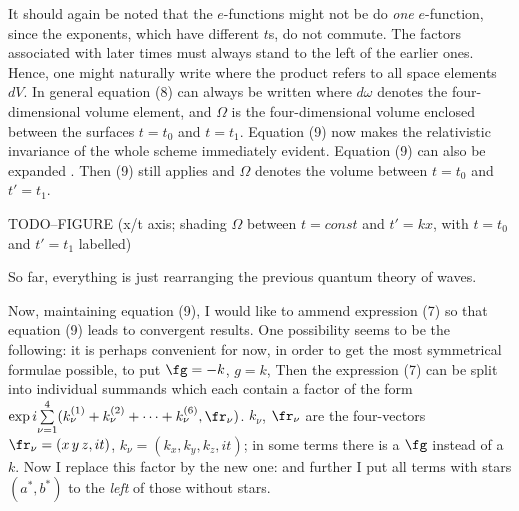 It should again be noted that the $e$-functions might not be  do \textit{one} $e$-function, since the exponents, which have different $t$s, do not commute. The factors associated with later times must always stand to the left of the earlier ones. Hence, one might naturally write
where the product refers to all space elements ${dV}$. In general equation (8) can always be written
where ${d\omega}$ denotes the four-dimensional volume element, and $\Omega$ is the four-dimensional volume enclosed between the surfaces $t=t_0$ and $t=t_1$. Equation (9) now makes the relativistic invariance of the whole scheme immediately evident. Equation (9) can also be expanded . Then (9) still applies and $\Omega$ denotes the volume between $t=t_0$ and $t'=t_1$.

TODO--FIGURE (x/t axis; shading $\Omega$ between $t=const$ and $t'=kx$, with $t=t_0$ and $t'=t_1$ labelled)

So far, everything is just rearranging the previous quantum theory of waves.

Now, maintaining equation (9), I would like to ammend expression (7) so that equation (9) leads to convergent results. One possibility seems to be the following: it is perhaps convenient for now, in order to get the most symmetrical formulae possible, to put $\fg=-k$, $g=k$,
Then the expression (7) can be split into individual summands which each contain a factor of the form $\exp{i\sumXY{\nu=1}{4}(k_\nu^{(1)}+k_\nu^{(2)}+\dots+k_\nu^{(6)},\fr_\nu})$. $k_\nu$, $\fr_\nu$ are the four-vectors $\fr_\nu=(x\,y\,z, it)$, $k_\nu=(k_x,k_y,k_z,it)$; in some terms there is a $\fg$ instead of a $k$. Now I replace this factor by the new one:
and further I put all terms with stars $(a^*,b^*)$ to the \textit{left} of those without stars.

